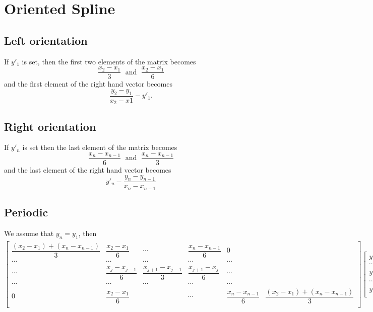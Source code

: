 \documentclass[aps]{revtex4}
\begin{document}
\section{Oriented Spline}
\subsection{Left orientation}
If $y'_1$ is set, then the first two elements of the matrix becomes
$$
	\dfrac{x_2-x_1}{3} \;\text{ and }\; \dfrac{x_2-x_1}{6}
$$
and the first element of the right hand vector becomes
$$
	\dfrac{y_2-y_1}{x_2-x1} - y'_1.
$$
\subsection{Right orientation}
If $y'_n$ is set then the last element of the matrix becomes
$$
	\dfrac{x_n-x_{n-1}}{6}\;\text{ and }\;\dfrac{x_n-x_{n-1}}{3}
$$
and the last element of the right hand vector becomes
$$
	y'_n - \dfrac{y_n-y_{n-1}}{x_n-x_{n-1}}
$$
\subsection{Periodic}
We assume that $y_n=y_1$, then
$$
	\begin{bmatrix}
		\dfrac{\left(x_2-x_1\right)+\left(x_n-x_{n-1}\right)}{3} & \dfrac{x_2-x_1}{6} & \cdots &  \dfrac{x_n-x_{n-1}}{6} & 0 \\
		\cdots & \cdots & \cdots & \cdots & \cdots \\
		\cdots & \dfrac{x_{j}-x_{j-1}}{6} & \dfrac{x_{j+1}-x_{j-1}}{3} & \dfrac{x_{j+1}-x_{j}}{6} & \cdots\\
		\cdots & \cdots & \cdots & \cdots & \cdots \\
		 0 & \dfrac{x_2-x_1}{6} &  & \cdots & \dfrac{x_n-x_{n-1}}{6} & \dfrac{\left(x_2-x_1\right)+\left(x_n-x_{n-1}\right)}{3} \\
	\end{bmatrix}
	\begin{bmatrix}
	y''_1\\
	\cdots\\
	y''_j\\
	\cdots\\
	y''_n\\
	\end{bmatrix}
	=
	\begin{bmatrix}
	\dfrac{y_2-y_1}{x_2-x_1}-\dfrac{y_n-y_{n-1}}{x_n-x_{n-1}}\\
	\cdots\\
	\dfrac{y_{j+1}-y_{j}}{x_{j+1}-x_{j}} - \dfrac{y_j-y_{j-1}}{x_j-x_{j-1}}\\
	\cdots\\
	\dfrac{y_n-y_{n-1}}{x_n-x_{n-1}}-\dfrac{y_2-y_1}{x_2-x_1}\\
	\end{bmatrix}
$$
\end{document}
